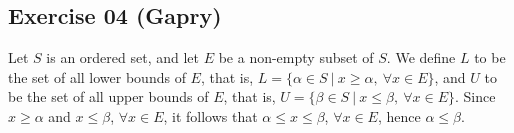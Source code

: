 \subsection*{Exercise 04 (Gapry)}
Let $S$ is an ordered set, and let $E$ be a non-empty subset of $S$.
We define $L$ to be the set of all lower bounds of $E$, that is, $L = \{\alpha \in S\ |\ x \ge \alpha,\ \forall x \in E\}$, and $U$ to be the set of all upper bounds of $E$, that is, $U = \{\beta \in S\ |\ x \le \beta,\ \forall x \in E\}$. Since $x \ge \alpha$ and $x \le \beta$, $\forall x \in E$, it follows that $\alpha \le x \le \beta$, $\forall x \in E$, hence $\alpha \le \beta$.
